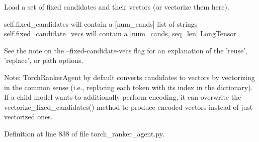 \begin{DoxyVerb}Load a set of fixed candidates and their vectors (or vectorize them here).

self.fixed_candidates will contain a [num_cands] list of strings
self.fixed_candidate_vecs will contain a [num_cands, seq_len] LongTensor

See the note on the --fixed-candidate-vecs flag for an explanation of the
'reuse', 'replace', or path options.

Note: TorchRankerAgent by default converts candidates to vectors by vectorizing
in the common sense (i.e., replacing each token with its index in the
dictionary). If a child model wants to additionally perform encoding, it can
overwrite the vectorize_fixed_candidates() method to produce encoded vectors
instead of just vectorized ones.
\end{DoxyVerb}
 

Definition at line 838 of file torch\+\_\+ranker\+\_\+agent.\+py.


